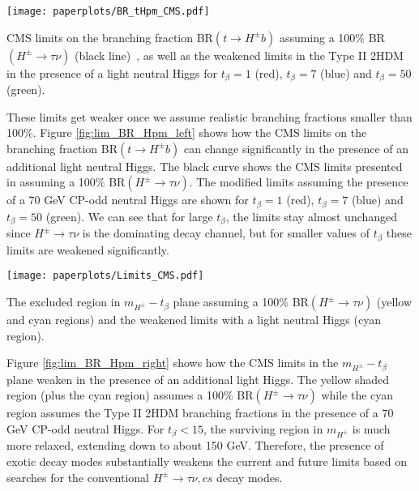 \begin{marginfigure}
 	\texttt{[image: paperplots/BR\_tHpm\_CMS.pdf]}
    \caption{CMS limits on the branching fraction BR$( t \rightarrow H^{\pm}b)$ assuming a 100\% BR$(H^{\pm} \rightarrow \tau \nu)$ (black line)~\cite{CMS:2014cdp}, as well as the weakened limits in the Type II 2HDM in the presence of a light neutral Higgs for $t_{\beta}=1$ (red), $t_{\beta}=7$ (blue) and $t_{\beta}=50$ (green).}
\label{fig:lim_BR_Hpm_left}
\end{marginfigure}

These limits get weaker once we assume realistic branching fractions smaller than 100\%. Figure \ref{fig:lim_BR_Hpm_left} shows how the CMS limits on the branching fraction BR$(t \rightarrow H^{\pm} b)$ can change significantly in the presence of an additional light neutral Higgs. The black curve shows the CMS limits presented in \cite{CMS:2014cdp} assuming a 100\% BR$(H^{\pm} \rightarrow \tau \nu)$. The modified limits assuming the presence of a 70 GeV CP-odd neutral Higgs are shown for $t_{\beta}=1$ (red), $t_{\beta}=7$ (blue) and $t_{\beta}=50$ (green). We can see that for large $t_{\beta}$, the limits stay almost unchanged since $H^{\pm} \rightarrow \tau \nu$ is the dominating decay channel, but for smaller values of $t_{\beta}$ these limits are weakened significantly.

\begin{marginfigure}
 	\texttt{[image: paperplots/Limits\_CMS.pdf]}
    \caption{The excluded region in $m_{H^\pm}-t_{\beta}$ plane assuming a 100\% BR$(H^{\pm} \rightarrow \tau \nu)$ (yellow and cyan regions) and the weakened limits with a light neutral Higgs (cyan region).}
\label{fig:lim_BR_Hpm_right}
\end{marginfigure}

Figure \ref{fig:lim_BR_Hpm_right} shows how the CMS limits in the $m_{H^{\pm}}-t_{\beta}$ plane weaken in the presence of an additional light Higgs. The yellow shaded region (plus the cyan region) assumes a 100\% BR$(H^{\pm} \rightarrow \tau \nu)$ while the cyan region assumes the Type II 2HDM branching fractions in the presence of a 70 GeV CP-odd neutral Higgs.  For $t_{\beta}<15$, the surviving region in $m_{H^{\pm}}$ is much more relaxed, extending down to about 150 GeV. Therefore, the presence of exotic decay modes substantially weakens the current and future limits based on searches for the conventional $H^{\pm} \rightarrow \tau \nu, cs$ decay modes. 


